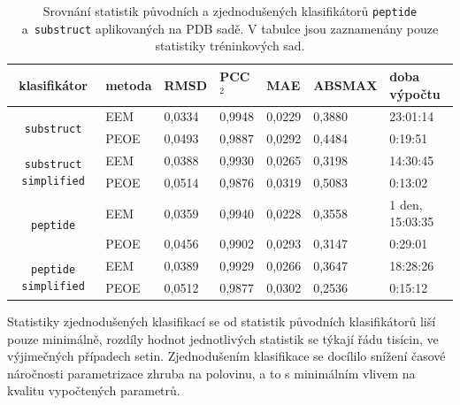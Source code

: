 \begin{table}[h]
    \renewcommand{\arraystretch}{1.4}
    \centering
    \begin{tabular}{c|l|l|l|l|l|l}
         \textbf{klasifikátor} &  \textbf{metoda} & \textbf{RMSD} & \textbf{PCC$^2$} & \textbf{MAE} & \textbf{ABSMAX} & \textbf{doba výpočtu}\\
         \hline
         \multirow{2}{6em}{\texttt{substruct}} & EEM & 0,0334 & 0,9948 & 0,0229 & 0,3880 & 23:01:14  \\
         & PEOE & 0,0493 & 0,9887 & 0,0292 & 0,4484 & 0:19:51 \\
         \hline
         \multirow{2}{6em}{\texttt{substruct simplified}} & EEM & 0,0388 & 0,9930 & 0,0265 & 0,3198 & 14:30:45 \\
         & PEOE & 0,0514 & 0,9876 & 0,0319 & 0,5083 & 0:13:02 \\
         \hline
         \multirow{2}{6em}{\texttt{peptide}} & EEM & 0,0359 & 0,9940 & 0,0228 & 0,3558 & 1 den, 15:03:35 \\
         & PEOE & 0,0456 & 0,9902 & 0,0293 & 0,3147 & 0:29:01 \\
         \hline
         \multirow{2}{6em}{\texttt{peptide simplified}} & EEM & 0,0389 & 0,9929 & 0,0266 & 0,3647 & 18:28:26 \\
         & PEOE & 0,0512 & 0,9877 & 0,0302 & 0,2536 & 0:15:12
    \end{tabular}
    \caption{Srovnání statistik původních a zjednodušených klasifikátorů \texttt{peptide} a~\texttt{substruct} aplikovaných na PDB sadě. V tabulce jsou zaznamenány pouze statistiky tréninkových sad.}
    \label{statistics_simplified}
\end{table}

Statistiky zjednodušených klasifikací se od statistik původních klasifikátorů liší pou\-ze minimálně, rozdíly hodnot jednotlivých statistik se týkají řádu tisícin, ve výjimečných případech setin. Zjednodušením klasifikace se docílilo snížení časové náročnosti parametrizace zhruba na polovinu, a to s minimálním vlivem na kvalitu vypočtených parametrů.


